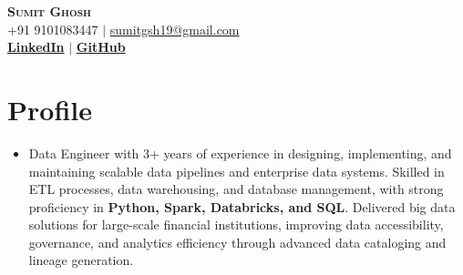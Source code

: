 \documentclass[letterpaper,11pt]{article}
\begin{document}




\begin{center}
    \textbf{\Huge \scshape Sumit Ghosh} \\ \vspace{1pt}
    \small +91 9101083447 $|$ \href{mailto:sumitgsh19@gmail.com}{{sumitgsh19@gmail.com}}    \\ 
    \small  
    \href{https://www.linkedin.com/in/sumitgsh/}{\bf LinkedIn} $|$
    \href{https://github.com/sumitgsh}{\bf GitHub} 
    
\end{center}



\section{Profile}
\begin{itemize}[leftmargin=0.15in, label={}]
\item 
Data Engineer with 3+ years of experience in designing, implementing, and maintaining scalable data pipelines and enterprise data systems. Skilled in ETL processes, data warehousing, and database management, with strong proficiency in \textbf{Python, Spark, Databricks, and SQL}. Delivered big data solutions for large-scale financial institutions, improving data accessibility, governance, and analytics efficiency through advanced data cataloging and lineage generation.
\end{itemize}
\end{document}
